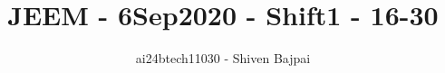 \documentclass[journal]{IEEEtran}
\begin{document}
\onecolumn

\vspace{3cm}

\renewcommand{\thefigure}{\theenumi}
\renewcommand{\thetable}{\theenumi}

\title{JEEM - 6Sep2020 - Shift1 - 16-30}
\author{ai24btech11030 - Shiven Bajpai}
\maketitle

\iffalse
\begin{multicols}{4}
\begin{enumerate}
    \item 
    \item 
    \item 
    \item 
\end{enumerate}
\end{multicols}
\fi
\end{document}
